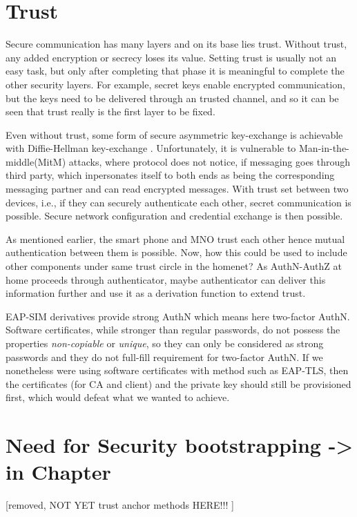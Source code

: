 \documentclass[12pt,a4paper,english]{tutthesis}
\begin{document}
\section{Trust}
\label{sec-2-6}

Secure communication has many layers and on its base lies trust. Without
trust, any added encryption or secrecy loses its value. 
Setting trust is usually not an easy task, but only after
completing that phase it is meaningful to complete the other security
layers.
For example, secret keys enable encrypted communication, but the keys need to be
delivered through an trusted channel, and so it can be seen that trust
really is the first layer to be fixed. 



Even without trust, some form of secure asymmetric key-exchange is achievable
with Diffie-Hellman key-exchange \cite{diffie1976new}. Unfortunately, it is vulnerable
to Man-in-the-middle(MitM) attacks, where protocol does not notice, 
if messaging goes through third party, which inpersonates itself to 
both ends as being the corresponding messaging partner and can
read encrypted messages.
With trust set between two devices, i.e.,  if they can securely
authenticate each other, secret communication is possible. 
Secure network configuration and credential exchange is then possible.


As mentioned earlier, the smart phone and MNO trust each other hence
mutual authentication between them is possible.  Now, how this could be used
to include other components under same trust circle in the homenet? 
As AuthN-AuthZ at home proceeds through authenticator, maybe
authenticator  can deliver this information further and use it as a
 derivation function to extend trust.

EAP-SIM derivatives provide strong AuthN which means here two-factor
AuthN. Software certificates, while stronger than regular passwords,
do not possess the properties \emph{non-copiable} or \emph{unique}, so they can only
be considered as strong passwords and they do not full-fill 
requirement for two-factor AuthN.
If we nonetheless were using software certificates with method such as
EAP-TLS, then the certificates (for CA and client) and the private key
should still be provisioned first, which would defeat what we wanted
to achieve.


\section{Need for Security bootstrapping -> in Chapter}
\label{sec-2-7}
[removed, NOT YET trust anchor methods HERE!!! ]
\end{document}
